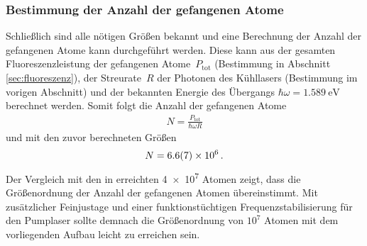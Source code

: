 \documentclass[11pt, a4paper]{article}
\numberwithin{equation}{section}
\begin{document}
\subsubsection{Bestimmung der Anzahl der gefangenen Atome}
\label{sec:atomzahl}
Schließlich sind alle nötigen Größen bekannt und eine Berechnung der Anzahl der gefangenen Atome kann durchgeführt werden.
Diese kann aus der gesamten Fluoreszenzleistung der gefangenen Atome~$P_\mathrm{tot}$ (Bestimmung in Abschnitt \ref{sec:fluoreszenz}), der Streurate~$R$ der Photonen des Kühllasers (Bestimmung im vorigen Abschnitt) und der bekannten Energie des Übergangs $\hbar \omega = \SI{1.589}{\electronvolt}$ \cite{steck} berechnet werden.
Somit folgt die Anzahl der gefangenen Atome
\begin{align*}
	N = \frac{P_\mathrm{tot}}{\hbar \omega R}
\end{align*}
und mit den zuvor berechneten Größen
\begin{align*}
	N = \num{6.6 +- 0.7e6} \, \text{.}
\end{align*}
Der Vergleich mit den in \cite{wieman} erreichten \num{4e7} Atomen zeigt, dass die Größenordnung der Anzahl der gefangenen Atomen übereinstimmt.
Mit zusätzlicher Feinjustage und einer funktionstüchtigen Frequenzstabilisierung für den Pumplaser sollte demnach die Größenordnung von $10^7$ Atomen mit dem vorliegenden Aufbau leicht zu erreichen sein.
\end{document}
